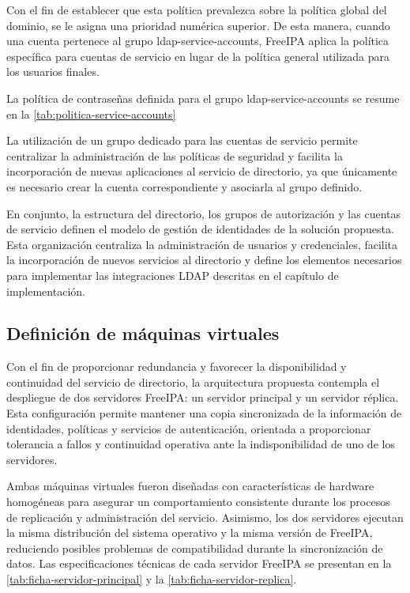 Con el fin de establecer que esta política prevalezca sobre la política global del dominio, se le asigna una prioridad numérica superior. De esta manera, cuando una cuenta pertenece al grupo ldap-service-accounts, FreeIPA aplica la política específica para cuentas de servicio en lugar de la política general utilizada para los usuarios finales.

La política de contraseñas definida para el grupo ldap-service-accounts se resume en la \autoref{tab:politica-service-accounts}



La utilización de un grupo dedicado para las cuentas de servicio permite centralizar la administración de las políticas de seguridad y facilita la incorporación de nuevas aplicaciones al servicio de directorio, ya que únicamente es necesario crear la cuenta correspondiente y asociarla al grupo definido.

En conjunto, la estructura del directorio, los grupos de autorización y las cuentas de servicio definen el modelo de gestión de identidades de la solución propuesta. Esta organización centraliza la administración de usuarios y credenciales, facilita la incorporación de nuevos servicios al directorio y define los elementos necesarios para implementar las integraciones \ac{LDAP} descritas en el capítulo de implementación.

\subsection{Definición de máquinas virtuales}\label{subsec:definicion-maquinas-virtuales}

Con el fin de proporcionar redundancia y favorecer la disponibilidad y continuidad del servicio de directorio, la arquitectura propuesta contempla el despliegue de dos servidores FreeIPA: un servidor principal y un servidor réplica. Esta configuración permite mantener una copia sincronizada de la información de identidades, políticas y servicios de autenticación, orientada a proporcionar tolerancia a fallos y continuidad operativa ante la indisponibilidad de uno de los servidores.

Ambas máquinas virtuales fueron diseñadas con características de hardware homogéneas para asegurar un comportamiento consistente durante los procesos de replicación y administración del servicio. Asimismo, los dos servidores ejecutan la misma distribución del sistema operativo y la misma versión de FreeIPA, reduciendo posibles problemas de compatibilidad durante la sincronización de datos. Las especificaciones técnicas de cada servidor FreeIPA se presentan en la \autoref{tab:ficha-servidor-principal} y la \autoref{tab:ficha-servidor-replica}.

